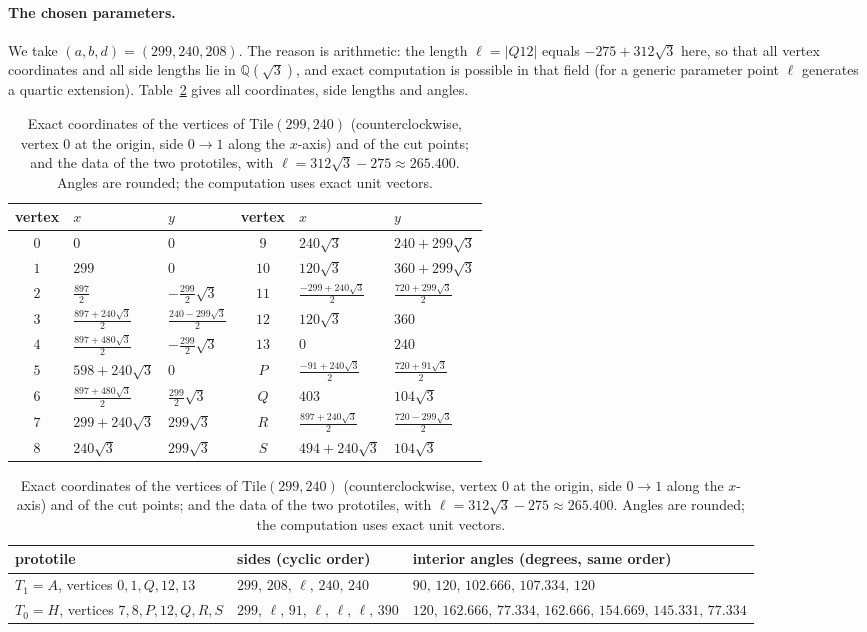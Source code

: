 \documentclass[11pt]{article}
\theoremstyle{remark}
\newcommand{\Tz}{T_0}
\newcommand{\To}{T_1}
\newcommand{\sq}{\sqrt{3}}
\begin{document}
\paragraph{The chosen parameters.} We take $(a,b,d)=(299,240,208)$. The reason is arithmetic: the length $\ell=|Q12|$ equals $-275+312\sqrt3$ here, so that all vertex coordinates and all side lengths lie in $\mathbb Q(\sqrt3)$, and exact computation is possible in that field (for a generic parameter point $\ell$ generates a quartic extension). Table~\ref{tab:data} gives all coordinates, side lengths and angles.

\begin{table}[ht]
\centering\small
\renewcommand{\arraystretch}{1.15}
\begin{tabular}{@{}cll@{\qquad}cll@{}}
\toprule
vertex & $x$ & $y$ & vertex & $x$ & $y$\\
\midrule
$0$ & $0$ & $0$ & $9$ & $240\sq$ & $240+299\sq$\\
$1$ & $299$ & $0$ & $10$ & $120\sq$ & $360+299\sq$\\
$2$ & $\tfrac{897}{2}$ & $-\tfrac{299}{2}\sq$ & $11$ & $\tfrac{-299+240\sq}{2}$ & $\tfrac{720+299\sq}{2}$\\
$3$ & $\tfrac{897+240\sq}{2}$ & $\tfrac{240-299\sq}{2}$ & $12$ & $120\sq$ & $360$\\
$4$ & $\tfrac{897+480\sq}{2}$ & $-\tfrac{299}{2}\sq$ & $13$ & $0$ & $240$\\
$5$ & $598+240\sq$ & $0$ & $P$ & $\tfrac{-91+240\sq}{2}$ & $\tfrac{720+91\sq}{2}$\\
$6$ & $\tfrac{897+480\sq}{2}$ & $\tfrac{299}{2}\sq$ & $Q$ & $403$ & $104\sq$\\
$7$ & $299+240\sq$ & $299\sq$ & $R$ & $\tfrac{897+240\sq}{2}$ & $\tfrac{720-299\sq}{2}$\\
$8$ & $240\sq$ & $299\sq$ & $S$ & $494+240\sq$ & $104\sq$\\
\bottomrule
\end{tabular}

\medskip
{\footnotesize\begin{tabular}{@{}p{}p{}p{}@{}}
\toprule
prototile & sides (cyclic order) & interior angles (degrees, same order)\\
\midrule
$\To=A$, vertices $0,1,Q,12,13$ & $299,\,208,\,\ell,\,240,\,240$ & $90,\,120,\,102.666,\,107.334,\,120$\\[2pt]
$\Tz=H$, vertices $7,8,P,12,Q,R,S$ & $299,\,\ell,\,91,\,\ell,\,\ell,\,\ell,\,390$ & $120,\,162.666,\,77.334,\,162.666,\,154.669,\,145.331,\,77.334$\\
\bottomrule
\end{tabular}}
\caption{Exact coordinates of the vertices of $\mathrm{Tile}(299,240)$ (counterclockwise, vertex $0$ at the origin, side $0\to1$ along the $x$-axis) and of the cut points; and the data of the two prototiles, with $\ell=312\sqrt3-275\approx265.400$. Angles are rounded; the computation uses exact unit vectors.}\label{tab:data}
\end{table}
\end{document}
